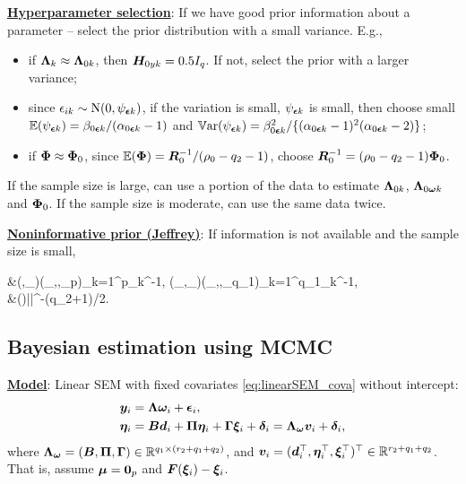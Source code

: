\documentclass[10pt,a4paper]{book}
\begin{document}
\noindent\textbf{\underline{Hyperparameter selection}}: If we have good prior information about a parameter -- select the prior
distribution with a small variance. E.g., 
\begin{itemize}
	\item if ${\boldsymbol\Lambda}_k\approx{\boldsymbol\Lambda}_{0k}$, then ${\boldsymbol H}_{0yk}=0.5 I_q$. If not, select the prior with a larger variance;
	\item since $\epsilon_{ik}\sim \mathrm{N}(0,\psi_{{\boldsymbol\epsilon} k})$, if the variation is small, $\psi_{{\boldsymbol\epsilon} k}$ is small, then choose small $\mathbb E(\psi_{{\boldsymbol\epsilon} k})=\beta_{0{\boldsymbol\epsilon} k}/(\alpha_{0{\boldsymbol\epsilon} k}-1)$ and $\mathbb{V}\mathrm{ar}(\psi_{{\boldsymbol\epsilon} k})=\beta_{0{\boldsymbol\epsilon} k}^2/\{(\alpha_{0{\boldsymbol\epsilon} k}-1)^2(\alpha_{0{\boldsymbol\epsilon} k}-2)\}$;
	\item if ${\boldsymbol\Phi}\approx {\boldsymbol\Phi}_{0}$, since $\mathbb E({\boldsymbol\Phi})={\boldsymbol R}_0^{-1}/(\rho_0-q_2-1)$, choose ${\boldsymbol R}_0^{-1}=(\rho_0-q_2-1){\boldsymbol\Phi}_0$.   
\end{itemize}
If the sample size is large, can use a portion of the data to estimate ${\boldsymbol\Lambda}_{0k}$, ${\boldsymbol\Lambda}_{0{\boldsymbol\omega} k}$ and ${\boldsymbol\Phi}_0$. If the sample size is moderate, can use the same data twice.  

\noindent\textbf{\underline{Noninformative prior (Jeffrey)}}: If information is not available and the sample size is small, 
\begin{sequation*}
	\begin{aligned}
		&\bbP(\baL,\baY_{\bae})\propto \bbP(\psi_{},\cdots,\psi_{\bae p})\propto\prod_{k=1}^{p}\psi_{\bae k}^{-1},\quad 
		\bbP(\baL_{\bao},\baY_{\bad})\propto \bbP(\psi_{},\cdots,\psi_{\bad q_{1}})\propto\prod_{k=1}^{q_{1}}\psi_{\bad k}^{-1},\\
		&\bbP(\baF)\propto|\baF|^{-(q_2+1)/2}.\end{aligned}
\end{sequation*}

\subsection{Bayesian estimation using MCMC}
\textbf{\underline{Model}}: Linear SEM with fixed covariates \eqref{eq:linearSEM_cova} without intercept:
\begin{equation*}
	\begin{aligned}
		{\boldsymbol y}_i&={\boldsymbol\Lambda}{\boldsymbol\omega}_i+{\boldsymbol\epsilon}_i, \\
		{\boldsymbol\eta}_i&={\boldsymbol B}{\boldsymbol d}_i+{\boldsymbol\Pi}{\boldsymbol\eta}_i+{\boldsymbol\Gamma}{\boldsymbol\xi}_i+{\boldsymbol\delta}_i={\boldsymbol\Lambda}_{{\boldsymbol\omega}}{\boldsymbol v}_i+{\boldsymbol\delta}_i,
	\end{aligned}
\end{equation*}
where ${\boldsymbol\Lambda}_{{\boldsymbol\omega}}=({\boldsymbol B},{\boldsymbol\Pi},{\boldsymbol\Gamma})\in\mathbb R^{q_1\times (r_2+q_1+q_2)}$, and ${\boldsymbol v}_i=({\boldsymbol d}_i^\top,{\boldsymbol\eta}_i^\top,{\boldsymbol\xi}_i^\top)^\top\in\mathbb R^{r_2+q_1+q_2}$. 
That is, assume ${\boldsymbol\mu}={\boldsymbol 0}_p$ and ${\boldsymbol F}({\boldsymbol\xi}_i)-{\boldsymbol\xi}_i$. 
\end{document}
